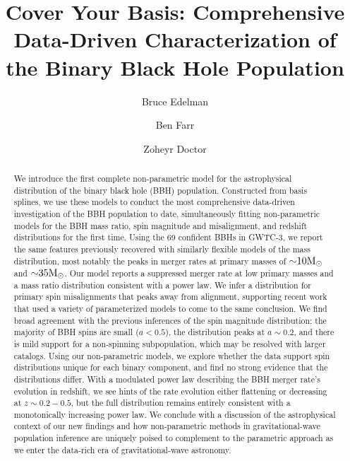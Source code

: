 \documentclass[twocolumn]{aastex631}
\newcommand{\msun}{\ensuremath{{\rm M}_\odot}}
\begin{document}
\title{Cover Your Basis: Comprehensive Data-Driven Characterization of the Binary Black Hole Population}

\author{Bruce Edelman}
\author{Ben Farr}
\author{Zoheyr Doctor}


\begin{abstract}                 
We introduce the first complete non-parametric model for the astrophysical distribution of the binary black hole (BBH) population.  Constructed from basis splines, we use these models to conduct the most comprehensive data-driven investigation of the BBH population to date, simultaneously fitting non-parametric models for the BBH mass ratio, spin magnitude and misalignment, and redshift distributions for the first time. Using the 69 confident BBHs in GWTC-3, we report the same features previously recovered 
with similarly flexible models of the mass distribution, most notably the peaks in merger rates at primary masses of ${\sim}10\msun$ and ${\sim}35\msun$. Our model reports a suppressed merger rate at low primary masses and a mass ratio distribution consistent with a power law. We infer a distribution for primary spin misalignments that peaks away from alignment, supporting recent work that used a variety of parameterized models to come to the same conclusion. We find broad agreement with the 
previous inferences of the spin magnitude distribution: the majority of BBH spins are small ($a<0.5$), the distribution peaks at $a\sim0.2$, 
and there is mild support for a non-spinning subpopulation, which may be resolved with larger catalogs. 
Using our non-parametric models, we explore whether the data support spin distributions unique for each binary component, and 
find no strong evidence that the distributions differ. With a modulated power law describing the BBH merger rate's evolution in redshift, 
we see hints of the rate evolution either flattening or decreasing at $z\sim0.2-0.5$, but the full distribution remains entirely consistent with a monotonically increasing power law. We conclude with a discussion of the astrophysical context of our new findings and how non-parametric methods in 
gravitational-wave population inference are uniquely poised to complement to the parametric approach as we enter the 
data-rich era of gravitational-wave astronomy.
\end{abstract}
\end{document}
